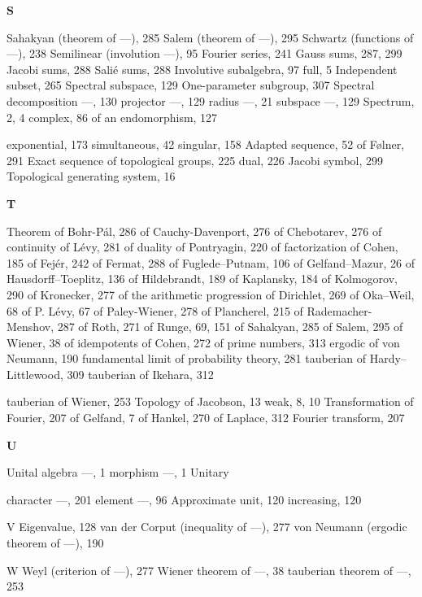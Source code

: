 \textbf{S}

Sahakyan (theorem of ---), 285 Salem (theorem of ---), 295 Schwartz (functions of ---), 238 Semilinear (involution ---), 95 Fourier series, 241 Gauss sums, 287, 299 Jacobi sums, 288 Salié sums, 288 Involutive subalgebra, 97 full, 5 Independent subset, 265 Spectral subspace, 129 One-parameter subgroup, 307 Spectral decomposition ---, 130 projector ---, 129 radius ---, 21 subspace ---, 129 Spectrum, 2, 4 complex, 86 of an endomorphism, 127

exponential, 173 simultaneous, 42 singular, 158 Adapted sequence, 52 of Følner, 291 Exact sequence of topological groups, 225 dual, 226 Jacobi symbol, 299 Topological generating system, 16

\textbf{T}

Theorem of Bohr-Pál, 286 of Cauchy-Davenport, 276 of Chebotarev, 276 of continuity of Lévy, 281 of duality of Pontryagin, 220 of factorization of Cohen, 185 of Fejér, 242 of Fermat, 288 of Fuglede--Putnam, 106 of Gelfand--Mazur, 26 of Hausdorff--Toeplitz, 136 of Hildebrandt, 189 of Kaplansky, 184 of Kolmogorov, 290 of Kronecker, 277 of the arithmetic progression of Dirichlet, 269 of Oka--Weil, 68 of P. Lévy, 67 of Paley-Wiener, 278 of Plancherel, 215 of Rademacher-Menshov, 287 of Roth, 271 of Runge, 69, 151 of Sahakyan, 285 of Salem, 295 of Wiener, 38 of idempotents of Cohen, 272 of prime numbers, 313 ergodic of von Neumann, 190 fundamental limit of probability theory, 281 tauberian of Hardy--Littlewood, 309 tauberian of Ikehara, 312

tauberian of Wiener, 253 Topology of Jacobson, 13 weak, 8, 10 Transformation of Fourier, 207 of Gelfand, 7 of Hankel, 270 of Laplace, 312 Fourier transform, 207

\textbf{U}

Unital algebra ---, 1 morphism ---, 1 Unitary

character ---, 201 element ---, 96 Approximate unit, 120 increasing, 120

V Eigenvalue, 128 van der Corput (inequality of ---), 277 von Neumann (ergodic theorem of ---), 190

W Weyl (criterion of ---), 277 Wiener theorem of ---, 38 tauberian theorem of ---, 253
